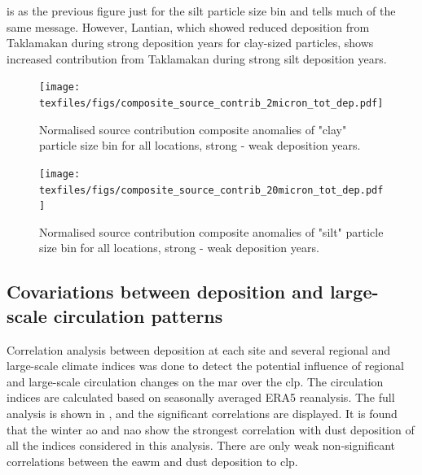  is as the previous figure just for the silt particle size bin and tells much of the same message. 
However, Lantian, which showed reduced deposition from Taklamakan during strong deposition years for clay-sized particles, shows increased contribution from Taklamakan during strong silt deposition years.     
\begin{figure}[hptb]
    \centering
    \texttt{[image: texfiles/figs/composite\_source\_contrib\_2micron\_tot\_dep.pdf]}
    \caption{Normalised source contribution composite anomalies of "clay" particle size bin for all locations, strong - weak deposition years.}
    \label{fig:source_contrib2mmu_anomalies}
\end{figure}

\begin{figure}[hptb]
    \centering
    \texttt{[image: texfiles/figs/composite\_source\_contrib\_20micron\_tot\_dep.pdf]}
    \caption{Normalised source contribution composite anomalies of "silt" particle size bin for all locations, strong - weak deposition years.}
    \label{fig:source_contrib20mmu_anomalies}
\end{figure}

\subsection{Covariations between deposition and large-scale circulation patterns}
Correlation analysis between deposition at each site and several regional and large-scale climate indices was done to detect the potential influence of regional and large-scale circulation changes on the \acrshort{mar} over the \acrshort{clp}.
The circulation indices are calculated based on seasonally averaged ERA5 reanalysis. 
The full analysis is shown in , and the significant correlations are displayed. 
It is found that the winter \acrshort{ao} and \acrshort{nao} show the strongest correlation with dust deposition of all the indices considered in this analysis. 
There are only weak non-significant correlations between the \acrshort{eawm} and dust deposition to \acrshort{clp}. 

